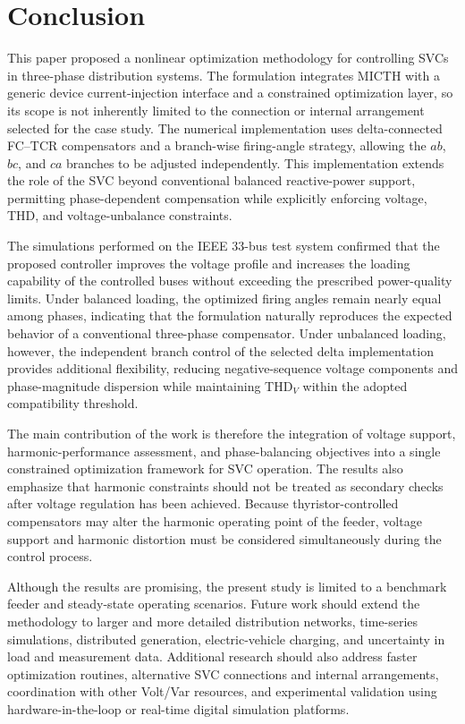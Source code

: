 \documentclass[journal]{IEEEtran}
\begin{document}
\section{Conclusion}
\label{sec:conclusion}

This paper proposed a nonlinear optimization methodology for controlling
SVCs in three-phase distribution systems. The formulation integrates MICTH
with a generic device current-injection interface and a constrained optimization
layer, so its scope is not inherently limited to the connection or internal
arrangement selected for the case study. The numerical implementation uses
delta-connected FC--TCR compensators and a branch-wise firing-angle strategy,
allowing the $ab$, $bc$, and $ca$ branches to be adjusted independently. This
implementation extends the role of the SVC beyond conventional balanced
reactive-power support, permitting phase-dependent compensation while explicitly
enforcing voltage, THD, and voltage-unbalance constraints.

The simulations performed on the IEEE 33-bus test system confirmed that the
proposed controller improves the voltage profile and increases the loading
capability of the controlled buses without exceeding the prescribed power-quality
limits. Under balanced loading, the optimized firing angles remain nearly equal
among phases, indicating that the formulation naturally reproduces the expected
behavior of a conventional three-phase compensator. Under unbalanced loading,
however, the independent branch control of the selected delta implementation
provides additional flexibility,
reducing negative-sequence voltage components and phase-magnitude dispersion
while maintaining THD$_V$ within the adopted compatibility threshold.

The main contribution of the work is therefore the integration of voltage
support, harmonic-performance assessment, and phase-balancing objectives into a
single constrained optimization framework for SVC operation. The results
also emphasize that harmonic constraints should not be treated as secondary
checks after voltage regulation has been achieved. Because thyristor-controlled
compensators may alter the harmonic operating point of the feeder, voltage
support and harmonic distortion must be considered simultaneously during the
control process.

Although the results are promising, the present study is limited to a benchmark
feeder and steady-state operating scenarios. Future work should extend the
methodology to larger and more detailed distribution networks, time-series
simulations, distributed generation, electric-vehicle charging, and uncertainty
in load and measurement data. Additional research should also address faster
optimization routines, alternative SVC connections and internal arrangements,
coordination with other Volt/Var resources, and experimental validation using
hardware-in-the-loop or real-time digital simulation platforms.
\end{document}
